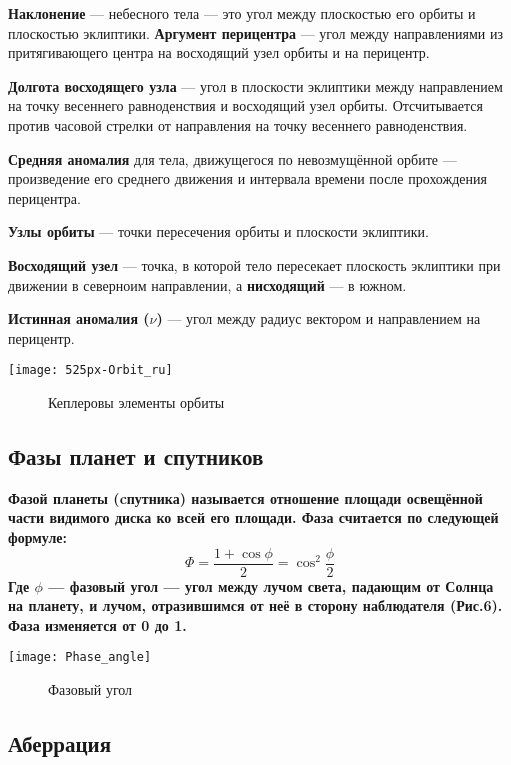 \documentclass[10pt,a5paper]{article}
\begin{document}
\textbf{Наклонение} --- небесного тела — это угол между плоскостью его орбиты и плоскостью эклиптики.
\textbf{Аргумент перицентра} --- угол между направлениями из притягивающего центра на восходящий узел орбиты и на перицентр.

\textbf{Долгота восходящего узла} --- угол в плоскости эклиптики между направлением на точку весеннего равноденствия и восходящий узел орбиты. Отсчитывается против часовой стрелки от направления на точку весеннего равноденствия.

\textbf{Средняя аномалия} для тела, движущегося по невозмущённой орбите --- произведение его среднего движения и интервала времени после прохождения перицентра.

\textbf{Узлы орбиты} --- точки пересечения орбиты и плоскости эклиптики.

\textbf{Восходящий узел} --- точка, в которой тело пересекает плоскость эклиптики при движении в северноим направлении, а \textbf{нисходящий} --- в южном.

\textbf{Истинная аномалия ($\nu$)} --- угол между радиус вектором и направлением на перицентр.
\begin{center}
\texttt{[image: 525px-Orbit\_ru]}
\begin{figure}[h!]
\caption{Кеплеровы элементы орбиты}
\end{figure}
\end{center}
\subsection*{Фазы планет и спутников}

\bfseries Фазой \mdseries планеты (cпутника) называется отношение площади освещённой  части видимого диска ко всей его площади.
Фаза считается по следующей формуле:
$$\Phi=\frac{1+\cos\phi}{2}=\cos^2\frac{\phi}{2}$$
Где $\phi$ --- \textbf{фазовый угол} --- угол между лучом света, падающим от Солнца на планету, и лучом, отразившимся от неё в сторону наблюдателя (Рис.6). Фаза изменяется от 0 до 1.
\begin{center}
\texttt{[image: Phase\_angle]}
\begin{figure}[h!]
\caption{Фазовый угол}
\end{figure}
\end{center}
\subsection*{Аберрация}
\end{document}
